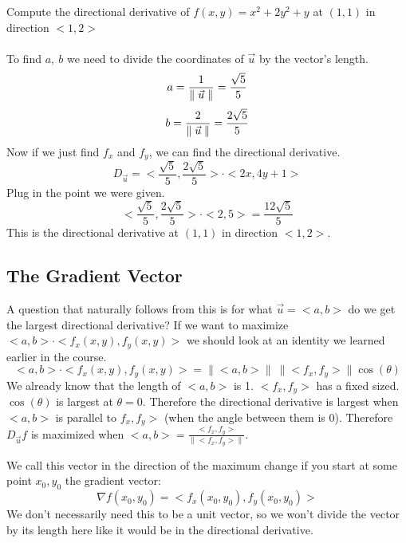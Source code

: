 \documentclass[12 pt]{article}
\begin{document}
        \begin{exmp*}
            Compute the directional derivative of $f(x,y)=x^2+2y^2+y$ at $(1,1)$ in direction $<1,2>$\\\\
            To find $a,\ b$ we need to divide the coordinates of $\vec{u}$ by the vector's length.
            $$a=\frac{1}{\parallel \vec{u} \parallel}=\frac{\sqrt{5}}{5}$$
            $$b=\frac{2}{\parallel \vec{u} \parallel}=\frac{2\sqrt{5}}{5}$$
            Now if we just find $f_x$ and $f_y$, we can find the directional derivative.
            $$D_{\vec{u}}=<\frac{\sqrt{5}}{5},\frac{2\sqrt{5}}{5}>\cdot<2x,4y+1>$$
            Plug in the point we were given.
            $$<\frac{\sqrt{5}}{5},\frac{2\sqrt{5}}{5}>\cdot<2,5>=\frac{12\sqrt{5}}{5}$$
            This is the directional derivative at $(1,1)$ in direction $<1,2>$.
        \end{exmp*}

        \subsection{The Gradient Vector}

        A question that naturally follows from this is for what $\vec{u}=<a,b>$ do we get the largest directional derivative? If we want to maximize $<a,b>\cdot<f_x(x,y),f_y(x,y)>$ we should look at an identity we learned earlier in the course.
        $$<a,b>\cdot<f_x(x,y),f_y(x,y)>=\parallel<a,b>\parallel\ \parallel<f_x,f_y>\parallel\cos(\theta)$$
        We already know that the length of $<a,b>$ is 1. $<f_x,f_y>$ has a fixed sized. $\cos(\theta)$ is largest at $\theta=0$. Therefore the directional derivative is largest when $<a,b>$ is parallel to $f_x,f_y>$ (when the angle between them is 0). Therefore $D_{\vec{u}}f$ is maximized when $<a,b>=\frac{<f_x,f_y>}{\parallel<f_x,f_y>\parallel}$.

        We call this vector in the direction of the maximum change if you start at some point $x_0,y_0$ the gradient vector:
        $$\nabla f(x_0,y_0)=<f_x(x_0,y_0),f_y(x_0,y_0)>$$
        We don't necessarily need this to be a unit vector, so we won't divide the vector by its length here like it would be in the directional derivative.
\end{document}
